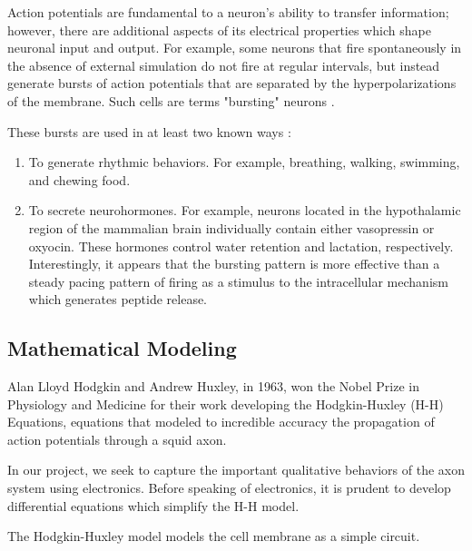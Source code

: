 \documentclass[12]{book}
\newcommand\0{\mathbf{0}}
\newcommand\<{\langle}
\renewcommand\>{\rangle}
\begin{document}
Action potentials are fundamental to a neuron's ability to transfer information; however, there are additional aspects of its electrical properties which shape neuronal input and output. For example, some neurons that fire spontaneously in the absence of external simulation do not fire at regular intervals, but instead generate bursts of action potentials that are separated by the hyperpolarizations of the membrane. Such cells are terms "bursting" neurons \cite{levitan2015neuron}.

These bursts are used in at least two known ways \cite{levitan2015neuron}:

\begin{enumerate}
\item To generate rhythmic behaviors. For example, breathing, walking, swimming, and chewing food.	
\item To secrete neurohormones. For example, neurons located in the hypothalamic region of the mammalian brain individually contain either vasopressin or oxyocin. These hormones control water retention and lactation, respectively. Interestingly, it appears that the bursting pattern is more effective than a steady pacing pattern of firing as a stimulus to the intracellular mechanism which generates peptide release.
\end{enumerate}

\subsection{Mathematical Modeling}

Alan Lloyd Hodgkin and Andrew Huxley, in 1963, won the Nobel Prize in Physiology and Medicine for their work developing the Hodgkin-Huxley (H-H) Equations, equations that modeled to incredible accuracy the propagation of action potentials through a squid axon. 

In our project, we seek to capture the important qualitative behaviors of the axon system using electronics. Before speaking of electronics, it is prudent to develop differential equations which simplify the H-H model.

The Hodgkin-Huxley model models the cell membrane as a simple circuit. 
\end{document}

